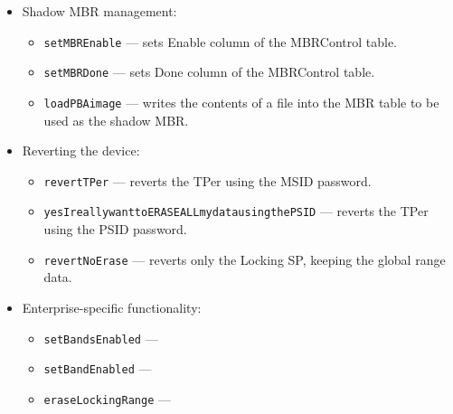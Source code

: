 \begin{itemize}
    \item Shadow MBR management: \begin{itemize}
\item \verb|setMBREnable| --- sets Enable column of the MBRControl table.
\item \verb|setMBRDone| --- sets Done column of the MBRControl table.
\item \verb|loadPBAimage| --- writes the contents of a file into the MBR table to be used as the shadow MBR.
    \end{itemize}
    
    \item Reverting the device: \begin{itemize}
\item \verb|revertTPer| --- reverts the TPer using the MSID password.
\item \verb|yesIreallywanttoERASEALLmydatausingthePSID| --- reverts the TPer using the PSID password.
\item \verb|revertNoErase| --- reverts only the Locking SP, keeping the global range data.
    \end{itemize}
    
    \item Enterprise-specific functionality: \begin{itemize}
\item \verb|setBandsEnabled| ---
\item \verb|setBandEnabled| --- 
\item \verb|eraseLockingRange| ---
    \end{itemize}
\end{itemize}




